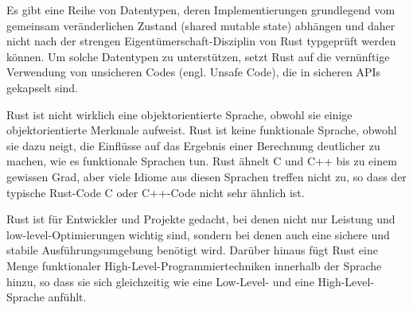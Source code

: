 Es gibt eine Reihe von Datentypen, deren Implementierungen grundlegend vom gemeinsam veränderlichen Zustand (shared mutable state) abhängen und daher nicht nach der strengen Eigentümerschaft-Disziplin von Rust typgeprüft werden können. Um solche Datentypen zu unterstützen, setzt Rust auf die vernünftige Verwendung von unsicheren Codes (engl. Unsafe Code), die in sicheren APIs gekapselt sind.





Rust ist nicht wirklich eine objektorientierte Sprache, obwohl sie einige objektorientierte Merkmale aufweist. Rust ist keine funktionale Sprache, obwohl sie dazu neigt, die Einflüsse auf das Ergebnis einer Berechnung deutlicher zu machen, wie es funktionale Sprachen tun. Rust ähnelt C und C++ bis zu einem gewissen Grad, aber viele Idiome aus diesen Sprachen treffen nicht zu, so dass der typische Rust-Code C oder C++-Code nicht sehr ähnlich ist.

Rust ist für Entwickler und Projekte gedacht, bei denen nicht nur Leistung und low-level-Optimierungen wichtig sind, sondern bei denen auch eine sichere und stabile Ausführungsumgebung benötigt wird. Darüber hinaus fügt Rust eine Menge funktionaler High-Level-Programmiertechniken innerhalb der Sprache hinzu, so dass sie sich gleichzeitig wie eine Low-Level- und eine High-Level-Sprache anfühlt.


